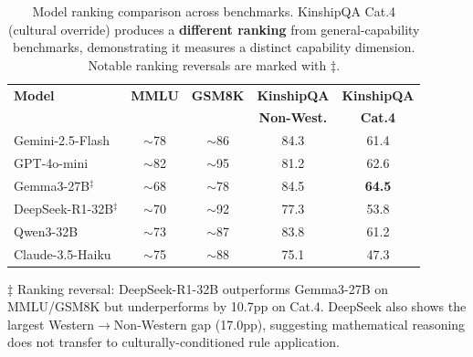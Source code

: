 
\begin{table}[t]
\centering
\small
\caption{Model ranking comparison across benchmarks. KinshipQA Cat.4 (cultural override) produces a \textbf{different ranking} from general-capability benchmarks, demonstrating it measures a distinct capability dimension. Notable ranking reversals are marked with $\ddagger$.}
\label{tab:cross-benchmark}
\begin{tabular}{lcccc}
\toprule
\textbf{Model} & \textbf{MMLU} & \textbf{GSM8K} & \textbf{KinshipQA} & \textbf{KinshipQA} \\
               &              &               & \textbf{Non-West.} & \textbf{Cat.4} \\
\midrule
Gemini-2.5-Flash   & $\sim$78 & $\sim$86 & 84.3 & 61.4 \\
GPT-4o-mini        & $\sim$82 & $\sim$95 & 81.2 & 62.6 \\
\midrule
Gemma3-27B$^\ddagger$     & $\sim$68 & $\sim$78 & 84.5 & \textbf{64.5} \\
DeepSeek-R1-32B$^\ddagger$ & $\sim$70 & $\sim$92 & 77.3 & 53.8 \\
Qwen3-32B          & $\sim$73 & $\sim$87 & 83.8 & 61.2 \\
\midrule
Claude-3.5-Haiku   & $\sim$75 & $\sim$88 & 75.1 & 47.3 \\
\bottomrule
\end{tabular}

\vspace{2pt}
\begin{flushleft}
\footnotesize{$\ddagger$ Ranking reversal: DeepSeek-R1-32B outperforms Gemma3-27B on MMLU/GSM8K but underperforms by 10.7pp on Cat.4. DeepSeek also shows the largest Western$\rightarrow$Non-Western gap (17.0pp), suggesting mathematical reasoning does not transfer to culturally-conditioned rule application.}
\end{flushleft}
\end{table}


